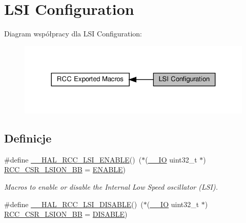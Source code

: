 \hypertarget{group___r_c_c___l_s_i___configuration}{}\section{L\+SI Configuration}
\label{group___r_c_c___l_s_i___configuration}
Diagram współpracy dla L\+SI Configuration\+:\nopagebreak
\begin{figure}[H]
\begin{center}
\leavevmode
\includegraphics[width=324pt]{group___r_c_c___l_s_i___configuration}
\end{center}
\end{figure}
\subsection*{Definicje}
\begin{DoxyCompactItemize}
\item 
\#define \hyperlink{group___r_c_c___l_s_i___configuration_ga560de8b8991db4a296de878a7a8aa58b}{\+\_\+\+\_\+\+H\+A\+L\+\_\+\+R\+C\+C\+\_\+\+L\+S\+I\+\_\+\+E\+N\+A\+B\+LE}()~($\ast$(\hyperlink{core__sc300_8h_aec43007d9998a0a0e01faede4133d6be}{\+\_\+\+\_\+\+IO} uint32\+\_\+t $\ast$) \hyperlink{group___r_c_c___bit_address___alias_region_gac34a2d63deae3efc65e66f8fb3c26dae}{R\+C\+C\+\_\+\+C\+S\+R\+\_\+\+L\+S\+I\+O\+N\+\_\+\+BB} = \hyperlink{group___exported__types_ggac9a7e9a35d2513ec15c3b537aaa4fba1a7d46875fa3ebd2c34d2756950eda83bf}{E\+N\+A\+B\+LE})
\begin{DoxyCompactList}\small\item\em Macros to enable or disable the Internal Low Speed oscillator (L\+SI). \end{DoxyCompactList}\item 
\#define \hyperlink{group___r_c_c___l_s_i___configuration_ga4f96095bb4acda60b7f66d5d927da181}{\+\_\+\+\_\+\+H\+A\+L\+\_\+\+R\+C\+C\+\_\+\+L\+S\+I\+\_\+\+D\+I\+S\+A\+B\+LE}()~($\ast$(\hyperlink{core__sc300_8h_aec43007d9998a0a0e01faede4133d6be}{\+\_\+\+\_\+\+IO} uint32\+\_\+t $\ast$) \hyperlink{group___r_c_c___bit_address___alias_region_gac34a2d63deae3efc65e66f8fb3c26dae}{R\+C\+C\+\_\+\+C\+S\+R\+\_\+\+L\+S\+I\+O\+N\+\_\+\+BB} = \hyperlink{group___exported__types_ggac9a7e9a35d2513ec15c3b537aaa4fba1ad3a9df141be0ccf10389b640f492b26d}{D\+I\+S\+A\+B\+LE})
\end{DoxyCompactItemize}


